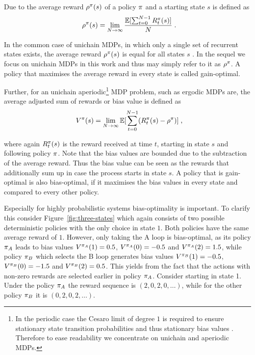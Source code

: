 \documentclass[envcountsame]{llncs}
\begin{document}
Due to \cite{Howard64} the average reward \(\rho^{\pi}(s)\) of a policy \(\pi\) and a starting
state \(s\) is defined as
\begin{align*}
  \avgrew^{\pol}(s) = \lim_{N \to \infty} \frac{\E [\sum_{t=0}^{N-1}R_{t}^{\pol}(s)]}{N}\tpkt
\end{align*}


In the common case of unichain MDPs, in which only a single set of recurrent states exists, the
average reward \(\rho^{\pi}(s)\) is equal for all states \(s\)
\citep{Mahadevan96_AverageRewardReinforcementLearningFoundationsAlgorithmsAndEmpiricalResults,Puterman94}.
In the sequel we focus on unichain MDPs in this work and thus may simply refer to it as
\(\rho^{\pi}\). A policy that maximises the average reward in every state is called
gain-optimal. %

Further, for an unichain aperiodic\footnote{In the periodic case the Cesaro limit of degree \(1\)
  is required to ensure stationary state transition probabilities and thus stationary bias
  values \citep{Puterman94}. Therefore to ease readability we concentrate on unichain
  and aperiodic MDPs.} MDP problem, such as ergodic MDPs are, the average adjusted sum of rewards or
bias value is defined as
\begin{align*}
  V^{\pol}(s) = \lim_{N \to \infty}{ \E [ \sum_{t=0}^{N-1}(R_{t}^{\pol}(s) - \avgrew^{\pol} )]}\tcom
\end{align*}


where again \(R_{t}^{\pi}(s)\) is the reward received at time \(t\), starting in state \(s\) and
following policy \(\pi\). Note that the bias values are bounded due to the subtraction of the
average reward. Thus the bias value can be seen as the rewards that additionally sum up in case the
process starts in state \(s\). A policy that is gain-optimal is also bias-optimal, if it maximises
the bias values in every state and compared to every other policy.


Especially for highly probabilistic systems bias-optimality is important. To clarify this consider
Figure~\ref{fig:three-states} which again consists of two possible deterministic policies with the
only choice in state \(1\). Both policies have the same average reward of \(1\). However, only
taking the A loop is bias-optimal, as its policy \(\pi_{A}\) leads to bias values
\(V^{\pi_{A}}(1)=0.5\), \(V^{\pi_{A}}(0)=-0.5\) and \(V^{\pi_{A}}(2)=1.5\), while policy
\(\pi_{B}\) which selects the B loop generates bias values \(V^{\pi_{B}}(1)=-0.5\),
\(V^{\pi_{B}}(0)=-1.5\) and \(V^{\pi_{B}}(2)=0.5\).
%
This yields from the fact that the actions with non-zero rewards are selected earlier in policy
\(\pi_{A}\). Consider starting in state 1. Under the policy \(\pi_{A}\) the reward sequence is
\((2,0,2,0,\ldots)\), while for the other policy \(\pi_{B}\) it is \((0,2,0,2,\ldots)\).
\end{document}
